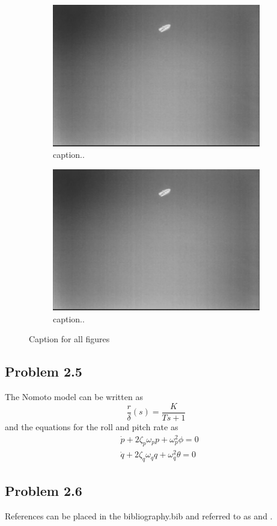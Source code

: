 \begin{figure}[ht]
\begin{subfigure}[b]{0.45\textwidth}
		\includegraphics[width=\textwidth]{assignment_1/rapport/figures/fig1}
		\caption{caption..}
		\label{fig:2c}
	\end{subfigure}
	\begin{subfigure}[b]{0.45\textwidth}
		\includegraphics[width=\textwidth]{assignment_1/rapport/figures/fig1}
		\caption{caption..}
		\label{fig:2d}
	\end{subfigure}		
	\caption{Caption for all figures}\label{fig:2}
\end{figure}

\subsection*{Problem 2.5}
The Nomoto model can be written as
\begin{equation}
	\frac{r}{\delta} (s) = \frac{K}{Ts+1}
\end{equation}
and the equations for the roll and pitch rate as
\begin{equation}
\begin{aligned}
	&\dot{p} + 2\zeta_p\omega_p p + \omega_p^2 \phi = 0\\
	&\dot{q} + 2\zeta_q\omega_q q + \omega_q^2 \theta = 0
\end{aligned}
\end{equation}

\subsection*{Problem 2.6}
References can be placed in the bibliography.bib and referred to as \cite{Fossen2011} and \cite{Fjellstad1994857}.
